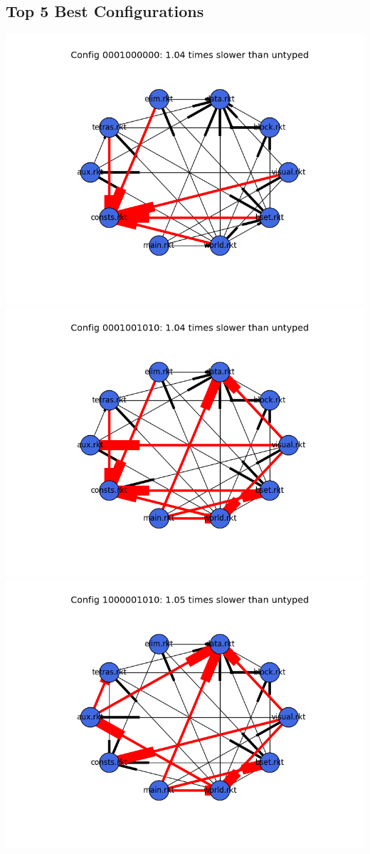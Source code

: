 \documentclass{article}
\begin{document}
\begin{itemize}
\subsection{Top 5 Best Configurations}
\includegraphics[width=\textwidth]{tetris-module-graph-0001000000.png}
\includegraphics[width=\textwidth]{tetris-module-graph-0001001010.png}
\includegraphics[width=\textwidth]{tetris-module-graph-1000001010.png}

\end{itemize}
\end{document}
